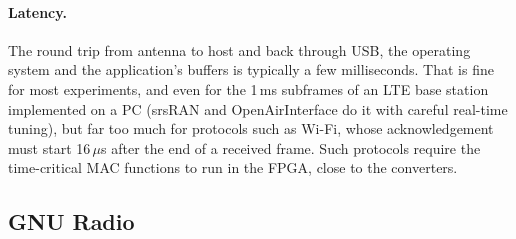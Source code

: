 \paragraph{Latency.} The round trip from antenna to host and back through USB, the operating system and
the application's buffers is typically a few milliseconds. That is fine for most experiments, and even
for the 1\,ms subframes of an LTE base station implemented on a PC (srsRAN and OpenAirInterface do it with
careful real-time tuning), but far too much for protocols such as Wi-Fi, whose acknowledgement must start
16\,$\mu$s after the end of a received frame. Such protocols require the time-critical MAC functions to run
in the FPGA, close to the converters.


\subsection{GNU Radio}

